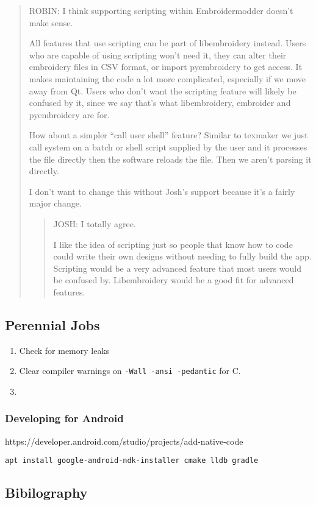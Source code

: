 \begin{quote}
ROBIN: I think supporting scripting within Embroidermodder doesn't make
sense.

All features that use scripting can be part of libembroidery instead.
Users who are capable of using scripting won't need it, they can alter
their embroidery files in CSV format, or import pyembroidery to get
access. It makes maintaining the code a lot more complicated, especially
if we move away from Qt. Users who don't want the scripting feature will
likely be confused by it, since we say that's what libembroidery,
embroider and pyembroidery are for.

How about a simpler ``call user shell'' feature? Similar to texmaker we
just call system on a batch or shell script supplied by the user and it
processes the file directly then the software reloads the file. Then we
aren't parsing it directly.

I don't want to change this without Josh's support because it's a fairly
major change.

\begin{quote}
JOSH: I totally agree.

I like the idea of scripting just so people that know how to code could
write their own designs without needing to fully build the app.
Scripting would be a very advanced feature that most users would be
confused by. Libembroidery would be a good fit for advanced features.
\end{quote}
\end{quote}

\hypertarget{perennial-jobs-1}{%
\subsection{Perennial Jobs}\label{perennial-jobs-1}}

\begin{enumerate}
\def\labelenumi{\arabic{enumi}.}
\tightlist
\item
  Check for memory leaks
\item
  Clear compiler warnings on \texttt{-Wall\ -ansi\ -pedantic} for C.
\item
\end{enumerate}

\hypertarget{developing-for-android-1}{%
\subsubsection{Developing for Android}\label{developing-for-android-1}}

https://developer.android.com/studio/projects/add-native-code

\begin{verbatim}
apt install google-android-ndk-installer cmake lldb gradle
\end{verbatim}

\hypertarget{bibilography-1}{%
\subsection{Bibilography}\label{bibilography-1}}

